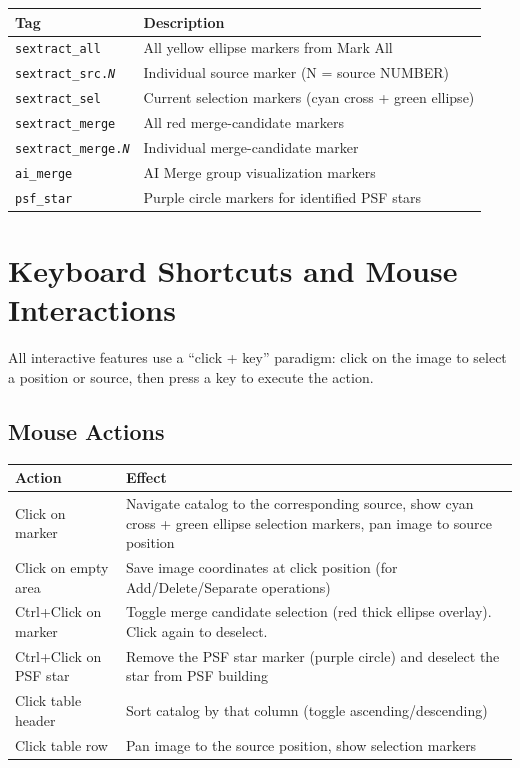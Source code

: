\documentclass[11pt,fleqn]{book}
\begin{document}
\begin{center}
\begin{longtable}{L{4.2cm} L{8.8cm}}
\toprule
\textbf{Tag} & \textbf{Description} \\
\midrule
\endhead
\texttt{sextract\_all} & All yellow ellipse markers from Mark All \\
\midrule
\texttt{sextract\_src.\textit{N}} & Individual source marker (N = source NUMBER) \\
\midrule
\texttt{sextract\_sel} & Current selection markers (cyan cross + green ellipse) \\
\midrule
\texttt{sextract\_merge} & All red merge-candidate markers \\
\midrule
\texttt{sextract\_merge.\textit{N}} & Individual merge-candidate marker \\
\midrule
\texttt{ai\_merge} & AI Merge group visualization markers \\
\midrule
\texttt{psf\_star} & Purple circle markers for identified PSF stars \\
\bottomrule
\end{longtable}
\end{center}


\section{Keyboard Shortcuts and Mouse Interactions}
\label{sec:keybindings}

All interactive features use a ``click + key'' paradigm: click on the image to select a position or source, then press a key to execute the action.

\subsection{Mouse Actions}

\begin{center}
\begin{longtable}{L{4.5cm} L{8.5cm}}
\toprule
\textbf{Action} & \textbf{Effect} \\
\midrule
\endhead
Click on marker & Navigate catalog to the corresponding source, show cyan cross + green ellipse selection markers, pan image to source position \\
\midrule
Click on empty area & Save image coordinates at click position (for Add/Delete/Separate operations) \\
\midrule
Ctrl+Click on marker & Toggle merge candidate selection (red thick ellipse overlay). Click again to deselect. \\
\midrule
Ctrl+Click on PSF star & Remove the PSF star marker (purple circle) and deselect the star from PSF building \\
\midrule
Click table header & Sort catalog by that column (toggle ascending/descending) \\
\midrule
Click table row & Pan image to the source position, show selection markers \\
\bottomrule
\end{longtable}
\end{center}
\end{document}

